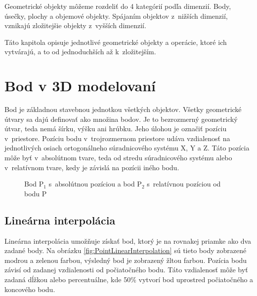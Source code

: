 Geometrické objekty môžeme rozdeliť do 4 kategórií podľa dimenzií. Body, úsečky, plochy a objemové objekty.
Spájaním objektov z~nižších dimenzií, vznikajú zložitejšie objekty z~vyšších dimenzií. 


Táto kapitola opisuje jednotlivé geometrické objekty a operácie, ktoré ich vytvárajú, a to od jednoduchších až k~zložitejším.

\section{Bod v 3D modelovaní}
Bod je základnou stavebnou jednotkou všetkých objektov. Všetky geometrické útvary sa dajú definovať ako množina bodov. Je to bezrozmerný geometrický útvar, teda nemá šírku, výšku ani hrúbku. Jeho úlohou je označiť pozíciu v~priestore. Pozíciu bodu v~trojrozmernom priestore udáva vzdialenosť na jednotlivých osiach ortogonálneho súradnicového systému X, Y a Z. Táto pozícia môže byť v~absolútnom tvare, teda od stredu súradnicového systému alebo v~relatívnom tvare, kedy je závislá na pozícii iného bodu.



\begin{figure}[H]
	\centering
	\caption{Bod P$_1$ s~absolútnou pozíciou a bod P$_2$ s~relatívnou pozíciou od bodu P}
	\label{fig:Point}
\end{figure}

\subsection*{Lineárna interpolácia}
Lineárna interpolácia umožňuje získať bod, ktorý je na rovnakej priamke ako dva zadané body. Na obrázku \ref{fig:PointLinearInterpolation} sú tieto body zobrazené modrou a zelenou farbou, výsledný bod je zobrazený žltou farbou. Pozícia bodu závisí od zadanej vzdia\-le\-nos\-ti od počiatočného bodu. Táto vzdia\-le\-nosť môže byť zadaná dĺžkou alebo percentuálne, kde 50\% vytvorí bod uprostred počiatočného a koncového bodu. 




